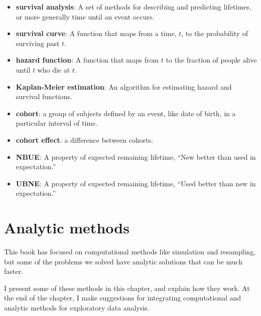 \documentclass[12pt]{book}
\begin{document}
\begin{itemize}

\item {\bf survival analysis}: A set of methods for describing and
  predicting lifetimes, or more generally time until an event occurs.

\item {\bf survival curve}: A function that maps from a time, $t$, to the
  probability of surviving past $t$.

\item {\bf hazard function}: A function that maps from $t$ to the fraction
of people alive until $t$ who die at $t$.

\item {\bf Kaplan-Meier estimation}: An algorithm for estimating hazard and
survival functions.

\item {\bf cohort}: a group of subjects defined by an event, like date of
birth, in a particular interval of time.

\item {\bf cohort effect}: a difference between cohorts.

\item {\bf NBUE}: A property of expected remaining lifetime, ``New
better than used in expectation.''

\item {\bf UBNE}: A property of expected remaining lifetime, ``Used
better than new in expectation.''

\end{itemize}


\chapter{Analytic methods}
\label{analysis}

This book has focused on computational methods like simulation and
resampling, but some of the problems we solved have
analytic solutions that can be much faster.

I present some of these methods in this chapter, and explain
how they work.  At the end of the chapter, I make suggestions
for integrating computational and analytic methods for exploratory
data analysis.
\end{document}
